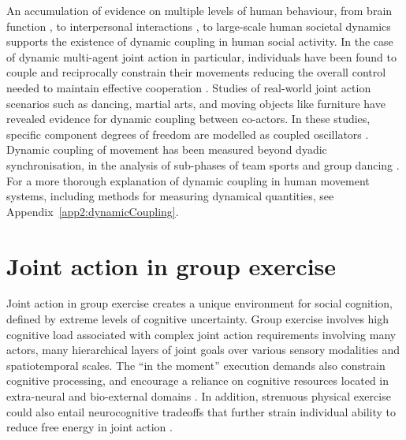 \begin{CJK}{UTF8}{gbsn}
An accumulation of evidence on multiple levels of human behaviour, from brain function \citep{Yufik1998,Sengupta2013}, to interpersonal interactions \citep{Kelso2009,Riley2011,Fusaroli2014}, to large-scale human societal dynamics \citep{Nowak2017} supports the existence of dynamic coupling in human social activity.  In the case of dynamic multi-agent joint action in particular, individuals have been found to couple and reciprocally constrain their movements reducing the overall control needed to maintain effective cooperation \citep{Ramenzoni2011,Ramenzoni2012,Riley2011,Schmidt1990}.  Studies of real-world joint action scenarios such as dancing, martial arts, and moving objects like furniture have revealed evidence for dynamic coupling between co-actors.  In these studies, specific component degrees of freedom are modelled as coupled oscillators \citep[using the HKB model, which describes the change in the relative phase between two oscillatory components. See][]{Haken1985,Kelso1986}.  Dynamic coupling of movement has been measured beyond dyadic synchronisation, in the analysis of sub-phases of team sports  \citep{Passos2014,Duarte2012} and group dancing \citep{Chauvigne2017}.  For a more thorough explanation of dynamic coupling in human movement systems, including methods for measuring dynamical quantities, see Appendix~\ref{app2:dynamicCoupling}.






























\section{Joint action in group exercise \label{sect:JAinGE}}

Joint action in group exercise creates a unique environment for social cognition, defined by extreme levels of cognitive uncertainty.  Group exercise involves high cognitive load associated with complex joint action requirements involving many actors, many hierarchical layers of joint goals over various sensory modalities and spatiotemporal scales. The ``in the moment'' execution demands also constrain cognitive processing, and encourage a reliance on cognitive resources located in extra-neural and bio-external domains \citep{Bourbousson2016}.  In addition, strenuous physical exercise could also entail neurocognitive tradeoffs that further strain individual ability to reduce free energy in joint action \citep{Dietrich2004b}.


\end{CJK}
